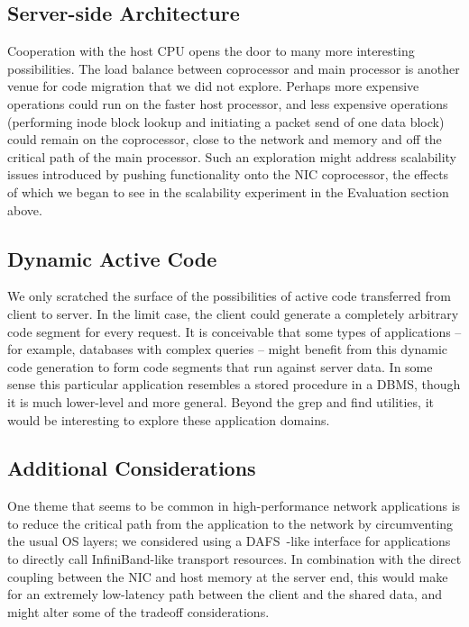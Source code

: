 \documentclass[10pt]{article}
\begin{document}
\subsection{Server-side Architecture}

Cooperation with the host CPU opens the door to many more interesting
possibilities. The load balance between coprocessor and main processor
is another venue for code migration that we did not explore. Perhaps
more expensive operations could run on the faster host processor, and
less expensive operations (performing inode block lookup and
initiating a packet send of one data block) could remain on the
coprocessor, close to the network and memory and off the critical path
of the main processor. Such an exploration might address scalability
issues introduced by pushing functionality onto the NIC coprocessor,
the effects of which we began to see in the scalability experiment in
the Evaluation section above.

\subsection{Dynamic Active Code}

We only scratched the surface of the possibilities of active code
transferred from client to server. In the limit case, the client could
generate a completely arbitrary code segment for every request. It is
conceivable that some types of applications -- for example, databases
with complex queries -- might benefit from this dynamic code
generation to form code segments that run against server data. In some
sense this particular application resembles a stored procedure in a
DBMS, though it is much lower-level and more general. Beyond the grep
and find utilities, it would be interesting to explore these
application domains.

\subsection{Additional Considerations}

One theme that seems to be common in high-performance network 
applications is to reduce the critical path from the application to
the network by circumventing the usual OS layers; we considered
using a DAFS~\cite{DAFS}-like interface for applications to directly
call InfiniBand-like transport resources. In combination with the
direct coupling between the NIC and host memory at the server end,
this would make for an extremely low-latency path between the client
and the shared data, and might alter some of the tradeoff
considerations.
\end{document}
